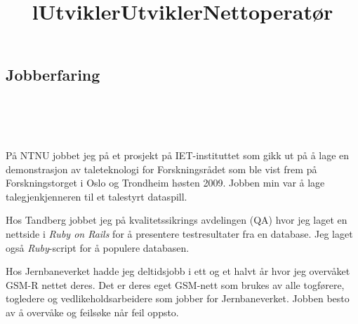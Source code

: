 \documentclass[overlapped,line,a4paper]{res}
\begin{document}
\begin{resume}

\section{\bf{Jobberfaring}}

\begin{format}
\title{l}\\
\\
\body\\
\end{format}

\title{Utvikler}
\begin{position}
	På NTNU jobbet jeg på et prosjekt på IET-instituttet som gikk ut på å lage en demonstrasjon av taleteknologi for Forskningsrådet som ble vist frem på Forskningstorget i Oslo og Trondheim høsten 2009. Jobben min var å lage talegjenkjenneren til et talestyrt dataspill.
\end{position}

\title{Utvikler}
\begin{position}
	Hos Tandberg jobbet jeg på kvalitetssikrings avdelingen (QA) hvor jeg laget en nettside i \emph{Ruby on Rails} for å presentere testresultater fra en database. Jeg laget også \emph{Ruby}-script for å populere databasen.
\end{position}

\title{Nettoperatør}
\begin{position}
	Hos Jernbaneverket hadde jeg deltidsjobb i ett og et halvt år hvor jeg overvåket GSM-R nettet deres. Det er deres eget GSM-nett som brukes av alle togførere, togledere og vedlikeholdsarbeidere som jobber for Jernbaneverket. Jobben besto av å overvåke og feilsøke når feil oppsto.
\end{position}

% 


\end{resume}
\end{document}
